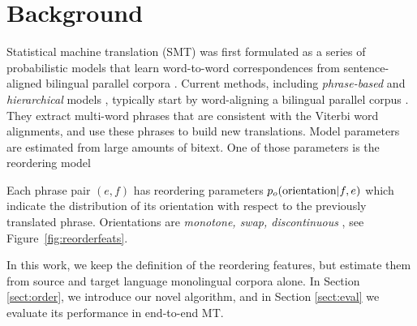 \documentclass[11pt,letterpaper]{article}
\newcommand{\mnote}[1]{\marginpar{%
  \vskip-\baselineskip
  \raggedright\footnotesize
  \itshape\hrule\smallskip\tiny{#1}\par\smallskip\hrule}}
\newcommand{\mtodo}[1]{\mnote{\textcolor{red}{#1}}}
\newcommand{\figref}[1]{Figure~\ref{#1}}
\begin{document}
\section{Background} \label{sect:bckg}


Statistical machine translation (SMT) was first formulated as a series of probabilistic models that learn word-to-word correspondences from sentence-aligned bilingual parallel corpora \cite{Brown:1993}.  \nocite{Brown1988}
%
Current methods, including {\em phrase-based} \cite{Och:2002,Koehn:2003} and {\em hierarchical} models \cite{Chiang:2005}, typically start by word-aligning a bilingual parallel corpus \cite{Och2003}.  They extract multi-word phrases that are consistent with the Viterbi word alignments, and use these phrases to build new translations.  Model parameters are estimated from large amounts of bitext.  One of those parameters is the reordering model

Each phrase pair $(e, f)$ has reordering parameters $p_o(\textnormal{orientation}|f,e)$ which indicate the distribution of its orientation with respect to the previously translated phrase. Orientations are {\it monotone, swap, discontinuous} \cite{tillman:2004:HLTNAACL,Kumar2004}, see \figref{fig:reorderfeats}. 

In this work, we keep the definition of the reordering features, but estimate them from source and target language monolingual corpora alone. In Section \ref{sect:order}, we introduce our novel algorithm, and in Section \ref{sect:eval} we evaluate its performance in end-to-end MT. 
\end{document}
